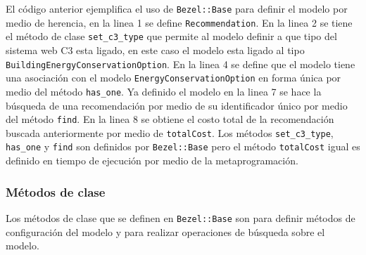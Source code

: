 El código anterior ejemplifica el uso de \texttt{Bezel::Base} para definir el modelo
por medio de herencia, en la linea 1 se define \texttt{Recommendation}. En la linea 2
se tiene el método de clase \texttt{set\_c3\_type} que permite al modelo definir
a que tipo del sistema web C3 esta ligado,  en este caso el modelo esta ligado al
tipo \texttt{BuildingEnergyConservationOption}. En la linea 4 se define que el modelo
tiene una asociación con el modelo \texttt{EnergyConservationOption} en forma única
por medio del método \texttt{has\_one}. Ya definido el modelo en la linea 7 se 
hace la búsqueda de una recomendación por medio de su identificador único por medio
del método \texttt{find}. En la linea 8 se obtiene el costo total de la recomendación
buscada anteriormente por medio de \texttt{totalCost}. Los métodos
\texttt{set\_c3\_type}, \texttt{has\_one} y \texttt{find} son definidos por
\texttt{Bezel::Base} pero el método \texttt{totalCost} igual es definido en tiempo
de ejecución por medio de la metaprogramación.

% 

\subsubsection{Métodos de clase}

Los métodos de clase que se definen en \texttt{Bezel::Base} son para
definir métodos de configuración del modelo y para realizar operaciones
de búsqueda sobre el modelo.



